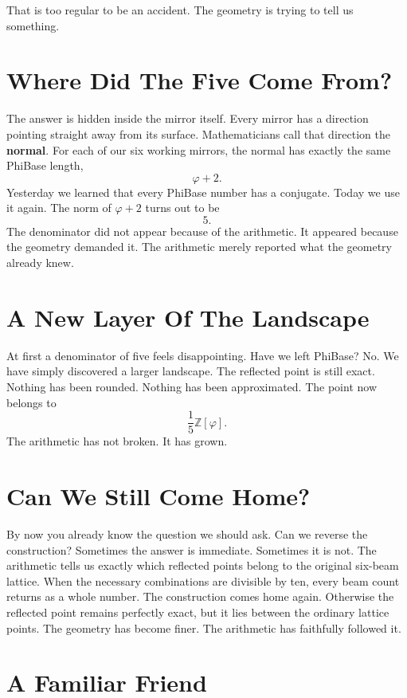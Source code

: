 That is too regular to be an accident. The geometry is trying to tell us something.

\section*{Where Did The Five Come From?}

The answer is hidden inside the mirror itself. Every mirror has a direction pointing straight away from its surface. Mathematicians call that direction the \textbf{normal}. For each of our six working mirrors, the normal has exactly the same PhiBase length,
\[
\varphi+2.
\]
Yesterday we learned that every PhiBase number has a conjugate. Today we use it again. The norm of \(\varphi+2\) turns out to be
\[
5.
\]
The denominator did not appear because of the arithmetic. It appeared because the geometry demanded it. The arithmetic merely reported what the geometry already knew.

\section*{A New Layer Of The Landscape}

At first a denominator of five feels disappointing. Have we left PhiBase? No. We have simply discovered a larger landscape. The reflected point is still exact. Nothing has been rounded. Nothing has been approximated. The point now belongs to
\[
\frac{1}{5}\mathbb{Z}[\varphi].
\]
The arithmetic has not broken. It has grown.

\section*{Can We Still Come Home?}

By now you already know the question we should ask. Can we reverse the construction? Sometimes the answer is immediate. Sometimes it is not. The arithmetic tells us exactly which reflected points belong to the original six-beam lattice. When the necessary combinations are divisible by ten, every beam count returns as a whole number. The construction comes home again. Otherwise the reflected point remains perfectly exact, but it lies between the ordinary lattice points. The geometry has become finer. The arithmetic has faithfully followed it.

\section*{A Familiar Friend}

